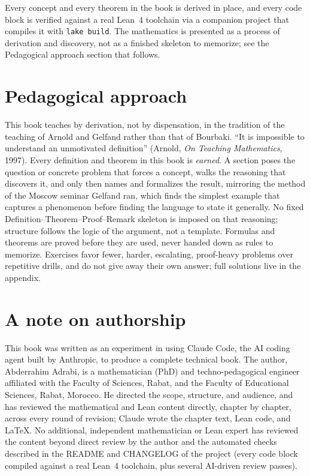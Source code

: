 Every concept and every theorem in the book is derived in place, and every
code block is verified against a real Lean~4 toolchain via a companion
project that compiles it with \texttt{lake build}. The mathematics is
presented as a process of derivation and discovery, not as a finished
skeleton to memorize; see the Pedagogical approach section that follows.

\chapter*{Pedagogical approach}
This book teaches by derivation, not by dispensation, in the tradition of
the teaching of Arnold and Gelfand rather than that of Bourbaki.
``It is impossible to understand an unmotivated definition'' (Arnold,
\emph{On Teaching Mathematics}, 1997). Every definition and theorem in
this book is \emph{earned}. A section poses the question or concrete
problem that forces a concept, walks the reasoning that discovers it, and
only then names and formalizes the result, mirroring the method of the
Moscow seminar Gelfand ran, which finds the simplest example that
captures a phenomenon before finding the language to state it generally.
No fixed
Definition--Theorem--Proof--Remark skeleton is imposed on that reasoning;
structure follows the logic of the argument, not a template. Formulas and
theorems are proved before they are used, never handed down as rules to
memorize. Exercises favor fewer, harder, escalating, proof-heavy problems
over repetitive drills, and do not give away their own answer; full
solutions live in the appendix.

\chapter*{A note on authorship}
This book was written as an experiment in using Claude Code, the AI
coding agent built by Anthropic, to produce a complete technical book.
The author, Abderrahim Adrabi, is a mathematician (PhD) and
techno-pedagogical engineer affiliated with the Faculty of Sciences,
Rabat, and the Faculty of Educational Sciences, Rabat, Morocco. He
directed the scope, structure, and audience, and has reviewed the
mathematical and Lean content directly, chapter by chapter, across every
round of revision; Claude wrote the chapter text, Lean code, and LaTeX.
No additional, independent mathematician or Lean expert has reviewed the
content beyond direct review by the author and the automated checks
described in the README and CHANGELOG of the project (every code block
compiled against a real Lean~4 toolchain, plus several AI-driven review
passes).

